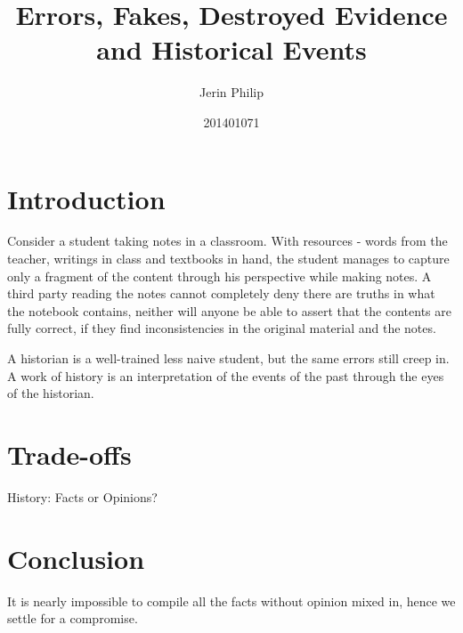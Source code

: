 \documentclass[a4paper]{article}
\title{Errors, Fakes, Destroyed Evidence and Historical Events}
\author{Jerin Philip}
\date{201401071}
\begin{document}
\maketitle

\section{Introduction}
Consider a student taking notes in a classroom. With resources - words
from the teacher, writings in class and textbooks in hand, the student
manages to capture only a fragment of the content through his
perspective while making notes. A third party reading the notes cannot
completely deny there are truths in what the notebook contains, neither
will anyone be able to assert that the contents are fully correct, if
they find inconsistencies in the original material and the notes.

A historian is a well-trained less naive student, but the same errors
still creep in. A work of history is an interpretation of the events of
the past through the eyes of the historian. 


\section{Trade-offs}
History: Facts or Opinions? 

\section{Conclusion}

It is nearly impossible to compile all the facts without opinion mixed
in, hence we settle for a compromise. 

\printbibliography 
\end{document}
